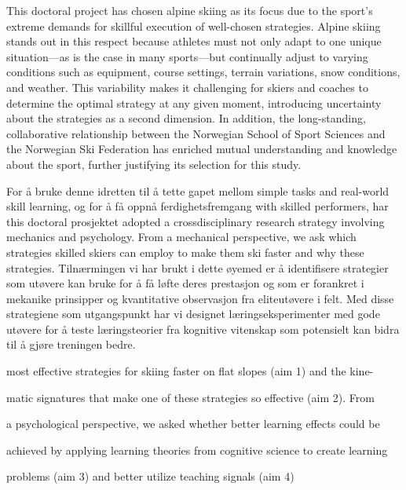 This doctoral project has chosen alpine skiing as its focus due to the sport's extreme demands for skillful execution of well-chosen strategies. Alpine skiing stands out in this respect because athletes must not only adapt to one unique situation—as is the case in many sports—but continually adjust to varying conditions such as equipment, course settings, terrain variations, snow conditions, and weather. This variability makes it challenging for skiers and coaches to determine the optimal strategy at any given moment, introducing uncertainty about the strategies as a second dimension. In addition, the long-standing, collaborative relationship between the Norwegian School of Sport Sciences and the Norwegian Ski Federation has enriched mutual understanding and knowledge about the sport, further justifying its selection for this study. 

For å bruke denne idretten til å tette gapet mellom simple tasks and real-world skill learning, og for å få oppnå ferdighetsfremgang with skilled performers, har this doctoral prosjektet adopted a crossdisciplinary research strategy involving mechanics and psychology. From a mechanical perspective, we ask which strategies skilled skiers can employ to make them ski faster and why these strategies. Tilnærmingen vi har brukt i dette øyemed er å identifisere strategier som utøvere kan bruke for å få løfte deres prestasjon og som er forankret i mekanike prinsipper og kvantitative observasjon fra eliteutøvere i felt. Med disse strategiene som utgangspunkt har vi designet læringseksperimenter med gode utøvere for å teste læringsteorier fra kognitive vitenskap som potensielt kan bidra til å gjøre treningen bedre. 











most effective strategies for skiing faster on flat slopes (aim 1) and the kine-

matic signatures that make one of these strategies so effective (aim 2). From

a psychological perspective, we asked whether better learning effects could be

achieved by applying learning theories from cognitive science to create learning

problems (aim 3) and better utilize teaching signals (aim 4) 


